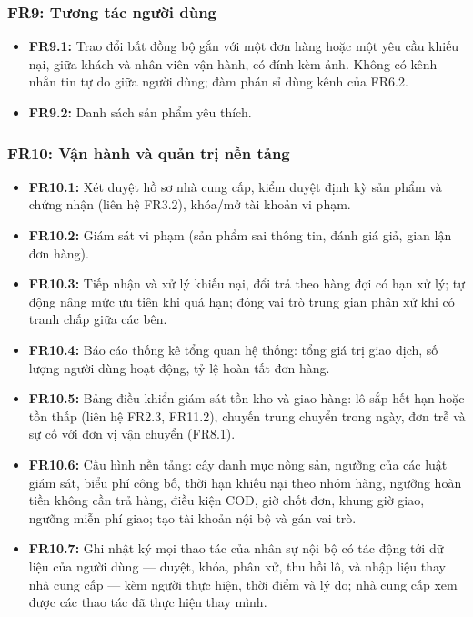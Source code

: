 \subsubsection*{FR9: Tương tác người dùng}
\begin{itemize}
    \item \textbf{FR9.1:} Trao đổi bất đồng bộ gắn với một đơn hàng hoặc một
    yêu cầu khiếu nại, giữa khách và nhân viên vận hành, có đính kèm ảnh.
    Không có kênh nhắn tin tự do giữa người dùng; đàm phán sỉ dùng kênh của
    FR6.2.
    \item \textbf{FR9.2:} Danh sách sản phẩm yêu thích.
\end{itemize}

\subsubsection*{FR10: Vận hành và quản trị nền tảng}
\begin{itemize}
    \item \textbf{FR10.1:} Xét duyệt hồ sơ nhà cung cấp, kiểm duyệt định kỳ
    sản phẩm và chứng nhận (liên hệ FR3.2), khóa/mở tài khoản vi phạm.
    \item \textbf{FR10.2:} Giám sát vi phạm (sản phẩm sai thông tin, đánh
    giá giả, gian lận đơn hàng).
    \item \textbf{FR10.3:} Tiếp nhận và xử lý khiếu nại, đổi trả theo hàng
    đợi có hạn xử lý; tự động nâng mức ưu tiên khi quá hạn; đóng vai trò
    trung gian phân xử khi có tranh chấp giữa các bên.
    \item \textbf{FR10.4:} Báo cáo thống kê tổng quan hệ thống: tổng giá trị
    giao dịch, số lượng người dùng hoạt động, tỷ lệ hoàn tất đơn hàng.
    \item \textbf{FR10.5:} Bảng điều khiển giám sát tồn kho và giao hàng:
    lô sắp hết hạn hoặc tồn thấp (liên hệ FR2.3, FR11.2), chuyến trung chuyển
    trong ngày, đơn trễ và sự cố với đơn vị vận chuyển (FR8.1).
    \item \textbf{FR10.6:} Cấu hình nền tảng: cây danh mục nông sản, ngưỡng
    của các luật giám sát, biểu phí công bố, thời hạn khiếu nại theo nhóm
    hàng, ngưỡng hoàn tiền không cần trả hàng, điều kiện COD, giờ chốt đơn,
    khung giờ giao, ngưỡng miễn phí giao; tạo tài khoản nội bộ và gán vai trò.
    \item \textbf{FR10.7:} Ghi nhật ký mọi thao tác của nhân sự nội bộ có tác
    động tới dữ liệu của người dùng --- duyệt, khóa, phân xử, thu hồi lô, và
    nhập liệu thay nhà cung cấp --- kèm người thực hiện, thời điểm và lý do;
    nhà cung cấp xem được các thao tác đã thực hiện thay mình.
\end{itemize}

